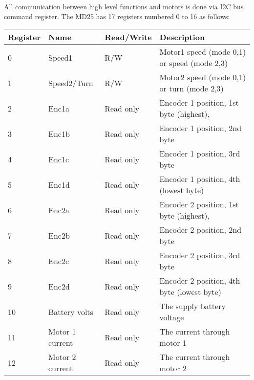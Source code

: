 \documentclass[11pt]{article}
\begin{document}
All communication between high level functions and motors is done via  I2C bus command register.
The MD25 has 17 registers numbered 0 to 16 as follows:
\begin{table}[h]
	\begin{tabular}{@{}llll@{}}
		\toprule
		\textbf{Register} & \textbf{Name}     & \textbf{Read/Write} & \textbf{Description}                                             \\ \midrule
		0                 & Speed1            & R/W                 & Motor1 speed (mode 0,1) or speed (mode 2,3)                      \\
		1                 & Speed2/Turn       & R/W                 & Motor2 speed (mode 0,1) or turn (mode 2,3)                       \\
		2                 & Enc1a             & Read only           & Encoder 1 position, 1st byte (highest),   \\
		3                 & Enc1b             & Read only           & Encoder 1 position, 2nd byte                                     \\
		4                 & Enc1c             & Read only           & Encoder 1 position, 3rd byte                                     \\
		5                 & Enc1d             & Read only           & Encoder 1 position, 4th (lowest byte)                            \\
		6                 & Enc2a             & Read only           & Encoder 2 position, 1st  byte (highest),  \\
		7                 & Enc2b             & Read only           & Encoder 2 position, 2nd byte                                     \\
		8                 & Enc2c             & Read only           & Encoder 2 position, 3rd byte                                     \\
		9                 & Enc2d             & Read only           & Encoder 2 position, 4th byte (lowest byte)                       \\
		10                & Battery volts     & Read only           & The supply battery voltage                                       \\
		11                & Motor 1 current   & Read only           & The current through motor 1                                      \\
		12                & Motor 2 current   & Read only           & The current through motor 2                                      \\

\end{tabular}
\end{table}
\end{document}
